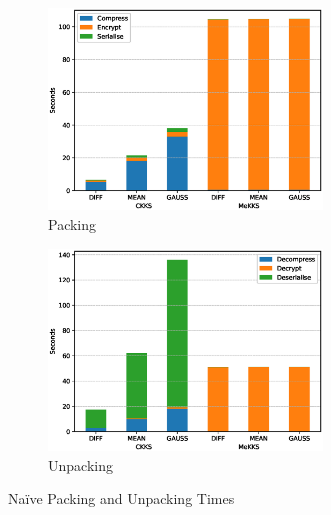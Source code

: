 \begin{figure}[h!]
    \centering
    \begin{subfigure}[b]{0.495\textwidth}
        \centering
        \includegraphics[width=0.8\textwidth]{figures/naivePackingTimes}
        \caption{Packing}
    \end{subfigure}
    \hfill
    \begin{subfigure}[b]{0.495\textwidth}
        \centering
        \includegraphics[width=0.8\textwidth]{figures/naiveUnpackingTimes}
        \caption{Unpacking}
    \end{subfigure}
    \caption{Na\"ive Packing and Unpacking Times}
    \label{fig:naivePackingAndUnpackingGraph}
\end{figure}
